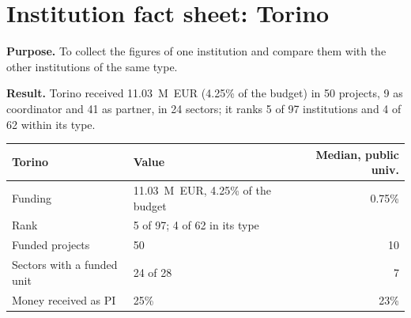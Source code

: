 \documentclass[11pt,a4paper]{article}
\begin{document}
\clearpage
\section{Institution fact sheet: Torino}
\textbf{Purpose.} To collect the figures of one institution and compare them with the other institutions of the same type.

\textbf{Result.} Torino received 11.03~M~EUR (4.25\% of the budget) in 50 projects, 9 as coordinator and 41 as partner, in 24 sectors; it ranks 5 of 97 institutions and 4 of 62 within its type.

\begin{table}[H]
\centering
\begin{tabular}{llr}
\toprule
Torino & Value & Median, public univ. \\
\midrule
Funding & 11.03~M~EUR, 4.25\% of the budget & 0.75\% \\
Rank & 5 of 97; 4 of 62 in its type &  \\
Funded projects & 50 & 10 \\
Sectors with a funded unit & 24 of 28 & 7 \\
Money received as PI & 25\% & 23\% \\
\bottomrule
\end{tabular}
\end{table}
\end{document}
